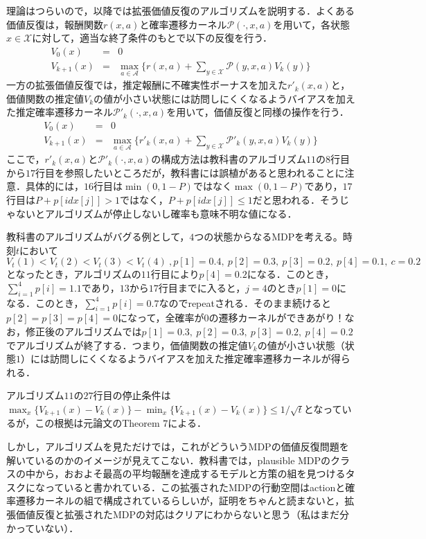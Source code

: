 \documentclass{jsarticle}
\begin{document}
理論はつらいので，以降では拡張価値反復のアルゴリズムを説明する．よくある価値反復は，報酬関数$r(x,a)$と確率遷移カーネル$\mathcal{P}(\cdot,x,a)$を用いて，各状態$x\in\mathcal{X}$に対して，適当な終了条件のもとで以下の反復を行う．
\begin{eqnarray*}
V_0(x) &=& 0\\
V_{k+1}(x) &=& \max_{a\in\mathcal{A}} \{ r(x,a) + \sum_{y \in \mathcal{X}}\mathcal{P}(y,x,a)V_{k}(y) \}
\end{eqnarray*}
一方の拡張価値反復では，推定報酬に不確実性ボーナスを加えた$r'_{k}(x,a)$と，価値関数の推定値$V_k$の値が小さい状態には訪問しにくくなるようバイアスを加えた推定確率遷移カーネル$\mathcal{P}'_{k}(\cdot,x,a)$を用いて，価値反復と同様の操作を行う．
\begin{eqnarray*}
V_0(x) &=& 0\\
V_{k+1}(x) &=& \max_{a\in\mathcal{A}} \{ r'_{k}(x,a) + \sum_{y \in \mathcal{X}}\mathcal{P}'_{k}(y,x,a)V_{k}(y) \}
\end{eqnarray*}
ここで，$r'_{k}(x,a)$と$\mathcal{P}'_{k}(\cdot,x,a)$の構成方法は教科書のアルゴリズム$11$の$8$行目から$17$行目を参照したいところだが，教科書には誤植があると思われることに注意．具体的には，$16$行目は$\min (0,1-P)$ではなく$\max (0,1-P)$であり，$17$行目は$P + p[idx[j]] > 1$ではなく，$ P + p[idx[j]] \le 1$だと思われる．そうじゃないとアルゴリズムが停止しないし確率も意味不明な値になる．

教科書のアルゴリズムがバグる例として，$4$つの状態からなるMDPを考える。時刻$t$において$V_t(1) < V_t(2) < V_t(3) < V_t(4)\ , p[1] = 0.4,\ p[2] = 0.3,\ p[3]=0.2,\  p[4] =0.1,\ c=0.2$となったとき，アルゴリズムの$11$行目により$p[4] =0.2$になる．このとき，$\sum_{i=1}^4 p[i] = 1.1$であり，$13$から$17$行目までに入ると，$j=4$のとき$p[1] = 0$になる．このとき，$\sum_{i=1}^4 p[i] = 0.7$なのでrepeatされる．そのまま続けると$p[2]=p[3]=p[4]=0$になって，全確率が$0$の遷移カーネルができあがり！なお，修正後のアルゴリズムでは$p[1]=0.3,\ p[2]=0.3,\ p[3]=0.2,\ p[4]=0.2$でアルゴリズムが終了する．つまり，価値関数の推定値$V_k$の値が小さい状態（状態$1$）には訪問しにくくなるようバイアスを加えた推定確率遷移カーネルが得られる．

アルゴリズム$11$の$27$行目の停止条件は$\max_x \{V_{k+1}(x) - V_{k}(x)\} -\min_x \{V_{k+1}(x) - V_{k}(x)\} \le 1/\sqrt{t}$となっているが，この根拠は元論文のTheorem $7$による．

しかし，アルゴリズムを見ただけでは，これがどういうMDPの価値反復問題を解いているのかのイメージが見えてこない．教科書では，plausible MDPのクラスの中から，おおよそ最高の平均報酬を達成するモデルと方策の組を見つけるタスクになっていると書かれている．この拡張されたMDPの行動空間はactionと確率遷移カーネルの組で構成されているらしいが，証明をちゃんと読まないと，拡張価値反復と拡張されたMDPの対応はクリアにわからないと思う（私はまだ分かっていない）．
\end{document}
